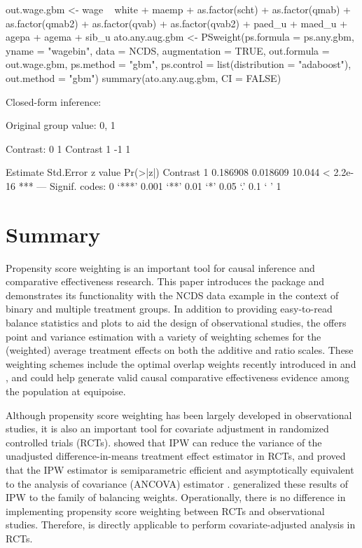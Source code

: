 \begin{example}
out.wage.gbm <- wage ~ white + maemp + as.factor(scht) + as.factor(qmab) +
    as.factor(qmab2) + as.factor(qvab) + as.factor(qvab2) + paed_u + 
    maed_u + agepa + agema + sib_u
ato.any.aug.gbm <- PSweight(ps.formula = ps.any.gbm, yname = "wagebin",
    data = NCDS,  augmentation = TRUE, out.formula = out.wage.gbm, 
    ps.method = "gbm", ps.control = list(distribution = "adaboost"), 
    out.method = "gbm")
summary(ato.any.aug.gbm, CI = FALSE)
\end{example}

\begin{Soutput}
Closed-form inference: 

Original group value:  0, 1 

Contrast: 
            0 1
Contrast 1 -1 1

          Estimate Std.Error z value  Pr(>|z|)    
Contrast 1 0.186908  0.018609  10.044 < 2.2e-16 ***
---
Signif. codes:  0 ‘***’ 0.001 ‘**’ 0.01 ‘*’ 0.05 ‘.’ 0.1 ‘ ’ 1
\end{Soutput}

 
\section{Summary} \label{sec:summary}

Propensity score weighting is an important tool for causal inference and comparative effectiveness research. This paper introduces the  package and demonstrates its functionality with the NCDS data example in the context of binary and multiple treatment groups. In addition to providing easy-to-read balance statistics and plots to aid the design of observational studies, the  offers point and variance estimation with a variety of weighting schemes for the (weighted) average treatment effects on both the additive and ratio scales. These weighting schemes include the optimal overlap weights recently introduced in \citet{LiMorganZaslavsky2018} and \citet{li2019propensity}, and could help generate valid causal comparative effectiveness evidence among the population at equipoise. 

Although propensity score weighting has been largely developed in observational studies, it is also an important tool for covariate adjustment in randomized controlled trials (RCTs). \citet{williamson2014variance} showed that IPW can reduce the variance of the unadjusted difference-in-means treatment effect estimator in RCTs, and \citet{shen2014inverse} proved that the IPW estimator is semiparametric efficient and asymptotically equivalent to the analysis of covariance (ANCOVA) estimator \citep{tsiatis2008covariate}. \citet{zeng2020RCT} generalized these results of IPW to the family of balancing weights. Operationally, there is no difference in implementing propensity score weighting between RCTs and observational studies. Therefore,  is directly applicable to perform covariate-adjusted analysis in RCTs.


